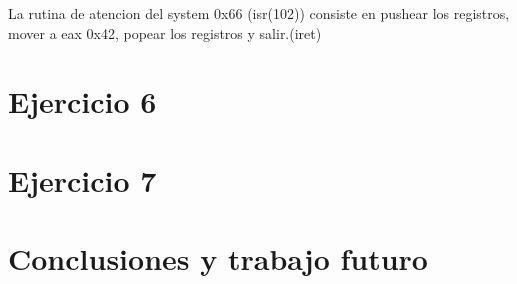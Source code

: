 \documentclass[a4paper]{article}
\begin{document}
	La rutina de atencion del system 0x66 (isr(102)) consiste en pushear los registros, mover a eax 0x42, popear los registros y salir.(iret)
	
\section{Ejercicio 6}	 
       
   

\section{Ejercicio 7}

\section{Conclusiones y trabajo futuro}
\end{document}
